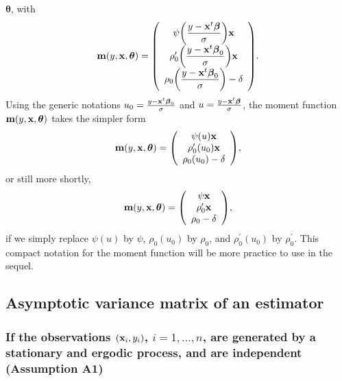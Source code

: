 $\boldsymbol{\theta}$, with
\[
\mathbf{m}\left(  y,\stvec{x},\boldsymbol{\theta}\right)  =\left(
\begin{array}
[c]{c}%
\psi\left(  \dfrac{y-\stvec{x}^{t}\boldsymbol\beta}{\sigma}\right)
\stvec{x}\\
\rho_{0}^{\prime}\left(  \dfrac{y-\stvec{x}^{t}\boldsymbol\beta_{0}}%
{\sigma}\right)  \stvec{x}\\
\rho_{0}\left(  \dfrac{y-\stvec{x}^{t}\boldsymbol\beta_{0}}{\sigma}\right)
-\delta
\end{array}
\right)  .
\]
Using the generic notations $u_{0}=\frac{y-\mathbf x^{t}\boldsymbol{\beta
}_{0}}{\sigma}$ and $u=\frac{y-\mathbf x^{t}\boldsymbol\beta}{\sigma}$, the
moment function $\mathbf{m}\left(  y,\stvec{x},\boldsymbol{\theta}\right)  $
takes the simpler form
\[
\mathbf{m}\left(  y,\stvec{x},\boldsymbol{\theta}\right)  =\left(
\begin{array}
[c]{c}%
\psi\left(  u\right)  \stvec{x}\\
\rho_{0}^{\prime}\left(  u_{0}\right)  \stvec{x}\\
\rho_{0}\left(  u_{0}\right)  -\delta
\end{array}
\right)  ,
\]
or still more shortly,
\begin{equation}
\mathbf{m}\left(  y,\stvec{x},\boldsymbol{\theta}\right)  =\left(
\begin{array}
[c]{c}%
\psi\stvec{x}\\
\rho_{0}^{\prime}\stvec{x}\\
\rho_{0}-\delta
\end{array}
\right)  , \label{Eq:GMM_moment_function_MM}%
\end{equation}
if we simply replace $\psi\left(  u\right)  $ by $\psi$, $\rho_{0}\left(
u_{0}\right)  $ by $\rho_{0}$, and $\rho_{0}^{\prime}\left(  u_{0}\right)  $
by $\rho_{0}^{\prime}$. This compact notation for the moment function will be
more practice to use in the sequel.

\subsection{Asymptotic variance matrix of an  estimator}

\subsubsection{If the observations $\left(  \stvec{x}_{i},y_{i}\right)  $,
$i = 1, \dots, n$, are generated by a stationary and ergodic process, and are
independent (Assumption A1)}

